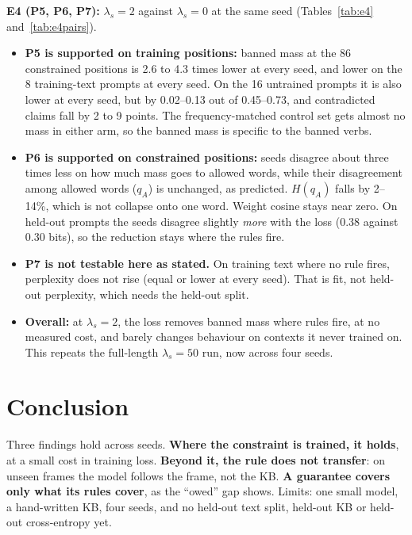 \documentclass[letterpaper, 10pt, conference]{IEEEtran}
\begin{document}
\textbf{E4 (P5, P6, P7):} $\lambda_s{=}2$ against $\lambda_s{=}0$ at the same seed (Tables~\ref{tab:e4} and~\ref{tab:e4pairs}).

\begin{itemize}
\item \textbf{P5 is supported on training positions:} banned mass at the 86 constrained positions is 2.6 to 4.3 times lower at every seed, and lower on the 8 training-text prompts at every seed. On the 16 untrained prompts it is also lower at every seed, but by 0.02--0.13 out of 0.45--0.73, and contradicted claims fall by 2 to 9 points. The frequency-matched control set gets almost no mass in either arm, so the banned mass is specific to the banned verbs.
\item \textbf{P6 is supported on constrained positions:} seeds disagree about three times less on how much mass goes to allowed words, while their disagreement among allowed words ($q_A$) is unchanged, as predicted. $H(q_A)$ falls by 2--14\%, which is not collapse onto one word. Weight cosine stays near zero. On held-out prompts the seeds disagree slightly \emph{more} with the loss (0.38 against 0.30 bits), so the reduction stays where the rules fire.
\item \textbf{P7 is not testable here as stated.} On training text where no rule fires, perplexity does not rise (equal or lower at every seed). That is fit, not held-out perplexity, which needs the held-out split.
\item \textbf{Overall:} at $\lambda_s{=}2$, the loss removes banned mass where rules fire, at no measured cost, and barely changes behaviour on contexts it never trained on. This repeats the full-length $\lambda_s{=}50$ run, now across four seeds.
\end{itemize}

\section{Conclusion}
Three findings hold across seeds. \textbf{Where the constraint is trained, it holds}, at a small cost in training loss. \textbf{Beyond it, the rule does not transfer}: on unseen frames the model follows the frame, not the KB. \textbf{A guarantee covers only what its rules cover}, as the ``owed'' gap shows. Limits: one small model, a hand-written KB, four seeds, and no held-out text split, held-out KB or held-out cross-entropy yet.
\end{document}
